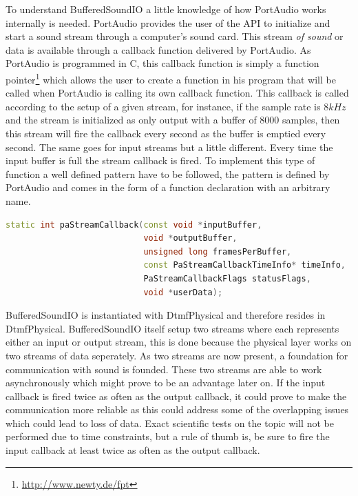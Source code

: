 	To understand BufferedSoundIO a little knowledge of how PortAudio works internally is needed. PortAudio provides the user of the API to initialize
	and start a sound stream through a computer's sound card. This stream \textit{of sound} or data is available through a callback function delivered
	by PortAudio. As PortAudio is programmed in C, this callback function is simply a function pointer\footnote{\url{http://www.newty.de/fpt}}
	which allows the user to create a function in his program that will be called when PortAudio is calling its own callback function.
	This callback is called according to the setup of a given stream, for instance, if the sample rate is $8kHz$ and the stream is initialized as 
	only output with a buffer of 8000 samples, then this stream will fire the callback every second as the buffer is emptied every second.
	The same goes for input streams but a little different. Every time the input buffer is full the stream callback is fired. To implement
	this type of function a well defined pattern have to be followed, the pattern is defined by PortAudio and comes in the form of a
	function declaration with an arbitrary name. 
	
	\begin{lstlisting}[float=htb,language={C++},caption={PortAudios callback function declaration. This declaration is used for both input
	streams, output streams, and the two in combination},label={lst:pa_callback}]
static int paStreamCallback(const void *inputBuffer,
							void *outputBuffer,
							unsigned long framesPerBuffer,
							const PaStreamCallbackTimeInfo* timeInfo,
							PaStreamCallbackFlags statusFlags,
							void *userData);
	\end{lstlisting}
	
	BufferedSoundIO is instantiated with DtmfPhysical and therefore resides in DtmfPhysical. BufferedSoundIO itself setup two streams where each
	represents either an input or output stream, this is done because the physical layer works on two streams of data seperately. As two streams are 
	now present, a foundation for communication with sound is founded. These two streams are able to work asynchronously which might prove to be an
	advantage later on. If the input callback is fired twice as often as the output callback, it could prove to make the communication more reliable
	as this could address some of the overlapping issues which could lead to loss of data. Exact scientific tests on the topic will not be performed
	due to time constraints, but a rule of thumb is, be sure to fire the input callback at least twice as often as the output callback.
	
